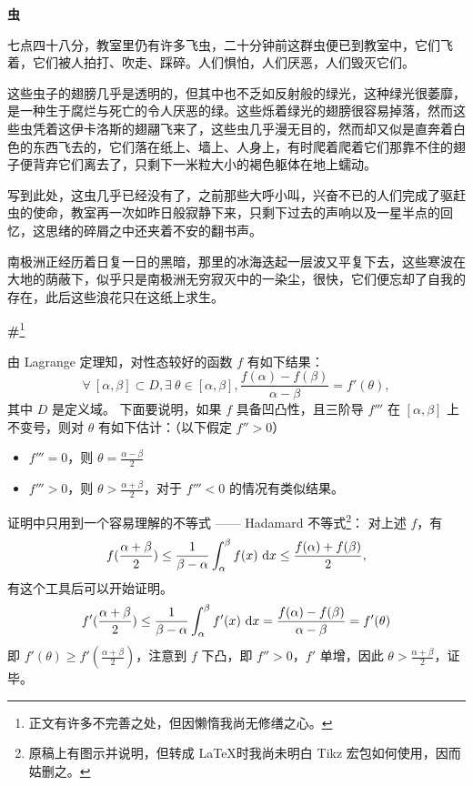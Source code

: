 \documentclass{ctexbook}
\begin{document}
\newpage
\textbf{虫}


\mbox


    七点四十八分，教室里仍有许多飞虫，二十分钟前这群虫便已到教室中，它们飞着，它们被人拍打、吹走、踩碎。人们惧怕，人们厌恶，人们毁灭它们。

    这些虫子的翅膀几乎是透明的，但其中也不乏如反射般的绿光，这种绿光很萎靡，是一种生于腐烂与死亡的令人厌恶的绿。这些烁着绿光的翅膀很容易掉落，然而这些虫凭着这伊卡洛斯的翅翮飞来了，这些虫几乎漫无目的，然而却又似是直奔着白色的东西飞去的，它们落在纸上、墙上、人身上，有时爬着爬着它们那靠不住的翅子便背弃它们离去了，只剩下一米粒大小的褐色躯体在地上蠕动。

    写到此处，这虫几乎已经没有了，之前那些大呼小叫，兴奋不已的人们完成了驱赶虫的使命，教室再一次如昨日般寂静下来，只剩下过去的声响以及一星半点的回忆，这思绪的碎屑之中还夹着不安的翻书声。

    南极洲正经历着日复一日的黑暗，那里的冰海迭起一层波又平复下去，这些寒波在大地的荫蔽下，似乎只是南极洲无穷寂灭中的一染尘，很快，它们便忘却了自我的存在，此后这些浪花只在这纸上求生。
    
\newpage
\textbf{\#}\footnote{\normalsize 正文有许多不完善之处，但因懒惰我尚无修缮之心。}


\mbox


    由 Lagrange 定理知，对性态较好的函数 \(f\) 有如下结果：
    \[
    \forall\ [\alpha,\beta] \subset D,\exists \ \theta \in [\alpha,\beta],\frac{f(\alpha) - f(\beta)}{\alpha - \beta} = f'(\theta),
    \]
    其中 \(D\) 是定义域。
    下面要说明，如果 \(f\) 具备凹凸性，且三阶导 \(f'''\) 在 \([\alpha,\beta]\) 上不变号，则对 \(\theta\) 有如下估计：（以下假定 \(f''>0\)）
    \begin{itemize}
        \item \(f'''=0\)，则 \(\displaystyle \theta = \frac{\alpha - \beta }{2}\)
        \item \(f''' > 0\)，则 \(\displaystyle\theta > \frac{\alpha + \beta}{2}\)，对于 \(f''' < 0\) 的情况有类似结果。
    \end{itemize}

    证明中只用到一个容易理解的不等式 —— Hadamard 不等式\footnote{\normalsize 原稿上有图示并说明，但转成 \LaTeX 时我尚未明白 Tikz 宏包如何使用，因而姑删之。}：
    对上述 \(f\)，有
    \[
    f(\frac{\alpha + \beta}{2}) \leq \frac{1}{\beta - \alpha} \int^\beta_\alpha f(x)\  {\rm d}x\leq \frac{f(\alpha)+f(\beta)}{2},
    \]
    有这个工具后可以开始证明。
    \[
    f'(\frac{\alpha + \beta}{2}) \leq \frac{1}{\beta - \alpha}\int^\beta_\alpha f'(x)\ {\rm d}x = \frac{f(\alpha) - f(\beta)}{\alpha - \beta} = f'(\theta)
    \]
    即 
    \(\displaystyle f'(\theta) \geq f'(\frac{\alpha + \beta}{2})\)，注意到 \(f\) 下凸，即 \(f''>0\)，\(f'\) 单增，因此 \(\displaystyle\theta > \frac{\alpha + \beta}{2}\)，证毕。
\end{document}

